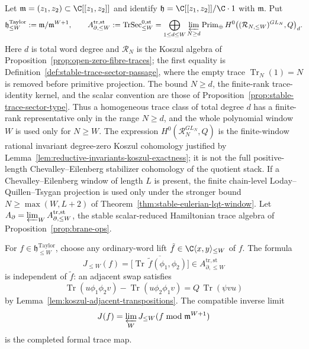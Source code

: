 \documentclass[11pt]{memoir}
\begin{document}
\begin{thm}\label{thm:Jf-coordinate-uniqueness}
  Let \(\mathfrak m=(z_1,z_2)\subset\C[[z_1,z_2]]\) and identify
  \(\mathfrak h=\C[[z_1,z_2]]/\C\cdot1\) with \(\mathfrak m\).  Put
  \[
    \mathfrak h^{\mathrm{Taylor}}_{\leq W}:=\mathfrak m/\mathfrak m^{W+1},\qquad
    A_{\partial,\leq W}^{\mathrm{tr,st}}
      :=
      \operatorname{TrSec}^{0,\mathrm{st}}_{\leq W}
      =
      \bigoplus_{1\leq d\leq W}
      \varprojlim_{N\geq d}
      \operatorname{Prim}_{\oplus}
      H^0\bigl((\mathcal R_{N,\leq W})^{GL_N},Q\bigr)_d .
  \]
  Here \(d\) is total word degree and \(\mathcal R_N\) is the Koszul
  algebra of Proposition~\ref{prop:open-zero-fibre-traces}; the first
  equality is Definition~\ref{def:stable-trace-sector-passage}, where
  the empty trace \(\operatorname{Tr}_N(1)=N\) is removed before
  primitive projection.  The bound \(N\geq d\), the finite-rank
  trace-identity kernel, and the scalar convention are those of
  Proposition~\ref{prop:stable-trace-sector-type}.  Thus a homogeneous
  trace class of total degree \(d\) has a finite-rank representative
  only in the range \(N\geq d\), and the whole polynomial window
  \(W\) is used only for \(N\geq W\).  The expression
  \(H^0(\mathcal R_N^{GL_N},Q)\) is the finite-window rational
  invariant degree-zero Koszul cohomology justified by
  Lemma~\ref{lem:reductive-invariants-koszul-exactness}; it is not the
  full positive-length Chevalley--Eilenberg stabilizer cohomology of the
  quotient stack.  If a
  Chevalley--Eilenberg window of length \(L\) is present, the finite
  chain-level Loday--Quillen--Tsygan projection is used only under the
  stronger bound \(N\geq\max(W,L+2)\) of
  Theorem~\ref{thm:stable-eulerian-lqt-window}.  Let
  \(A_\partial=\varprojlim_W A_{\partial,\leq W}^{\mathrm{tr,st}}\), the
  stable scalar-reduced Hamiltonian trace algebra of
  Proposition~\ref{prop:brane-ops}.

  For \(f\in\mathfrak h^{\mathrm{Taylor}}_{\leq W}\), choose any ordinary-word lift
  \(\tilde f\in\C\langle x,y\rangle_{\leq W}\) of \(f\).  The formula
  \[
    J_{\leq W}(f)
      =
      \bigl[
      \overline{\operatorname{Tr}\,\tilde f(\phi_1,\phi_2)}
      \bigr]
      \in A_{\partial,\leq W}^{\mathrm{tr,st}}
  \]
  is independent of \(\tilde f\): an adjacent swap satisfies
  \[
    \operatorname{Tr}(u\phi_1\phi_2v)
    -\operatorname{Tr}(u\phi_2\phi_1v)
    =
    Q\,\operatorname{Tr}(\psi vu)
  \]
  by Lemma~\ref{lem:koszul-adjacent-transpositions}.  The compatible
  inverse limit
  \[
    J(f)=\varprojlim_W J_{\leq W}(f\bmod \mathfrak m^{W+1})
  \]
  is the completed formal trace map.


\end{thm}
\end{document}
